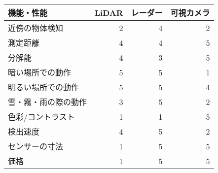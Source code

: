\begin{tabular}{lrrr}
\hline
機能・性能 & \multicolumn{1}{l}{LiDAR} & \multicolumn{1}{l}{レーダー} & \multicolumn{1}{l}{可視カメラ} \\
\hline
\hline
近傍の物体検知 & 2     & 4     & 2 \\
測定距離  & 4     & 4     & 5 \\
分解能   & 4     & 3     & 5 \\
暗い場所での動作 & 5     & 5     & 1 \\
明るい場所での動作 & 5     & 5     & 4 \\
雪・霧・雨の際の動作 & 3     & 5     & 2 \\
色彩/コントラスト & 1     & 1     & 5 \\
検出速度  & 4     & 5     & 2 \\
センサーの寸法 & 1     & 5     & 5 \\
価格    & 1     & 5     & 5 \\
\hline
\end{tabular}%
